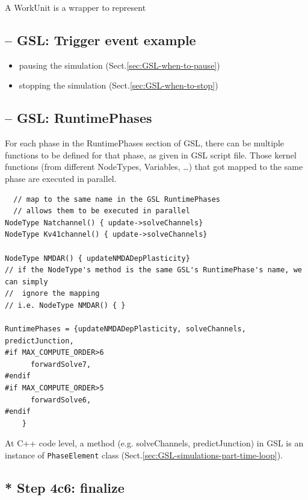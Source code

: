 A WorkUnit is a wrapper to represent 

\subsection{-- GSL: Trigger event example}
\label{sec:GSL-trigger-event-example}

  \begin{itemize}
    \item pausing the simulation (Sect.\ref{sec:GSL-when-to-pause})
    \item stopping the simulation (Sect.\ref{sec:GSL-when-to-stop})
  \end{itemize}

\subsection{-- GSL: RuntimePhases}
\label{sec:GSL-runtimephase-example}

For each phase in the RuntimePhases section of GSL, there can be multiple
functions to be defined for that phase, as given in GSL script file. Those
kernel functions (from different NodeTypes, Variables, \ldots) that got mapped
to the same phase are executed in parallel.

\begin{lstlisting}
  // map to the same name in the GSL RuntimePhases
  // allows them to be executed in parallel
NodeType Natchannel() { update->solveChannels}
NodeType Kv41channel() { update->solveChannels}

NodeType NMDAR() { updateNMDADepPlasticity} 
// if the NodeType's method is the same GSL's RuntimePhase's name, we can simply
//  ignore the mapping 
// i.e. NodeType NMDAR() { } 

RuntimePhases = {updateNMDADepPlasticity, solveChannels, predictJunction,
#if MAX_COMPUTE_ORDER>6
      forwardSolve7,
#endif
#if MAX_COMPUTE_ORDER>5  
      forwardSolve6,
#endif
    }
\end{lstlisting}

At C++ code level, a method (e.g. solveChannels, predictJunction) in GSL is
an instance of \verb!PhaseElement! class (Sect.\ref{sec:GSL-simulations-part-time-loop}). 



\subsection{* Step 4c6: finalize}
\label{sec:GSL-simulations-part-finalize}

